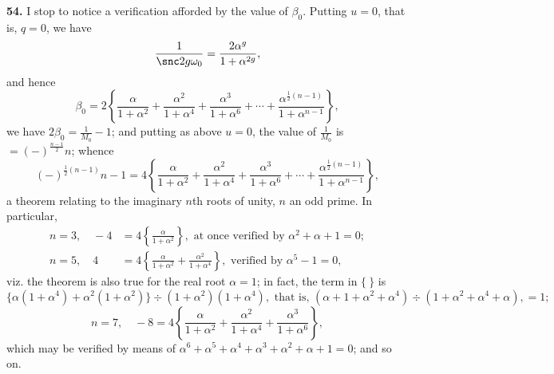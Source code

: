 \documentclass[11pt,a4paper]{book}
\begin{document}
\textbf{54.} I stop to notice a verification afforded by the value of $\beta_0$. Putting $u = 0$, that is, $q = 0$, we have
\[
\frac{1}{\snc 2g\omega_0} = \frac{2\alpha^g}{1 + \alpha^{2g}},
\]
and hence
\[
\beta_0 = 2\left\{
\frac{\alpha}{1 + \alpha^2} + \frac{\alpha^2}{1 + \alpha^4} + \frac{\alpha^3}{1 + \alpha^6} + \cdots
+ \frac{\alpha^{\frac{1}{2}(n-1)}}{1 + \alpha^{n-1}}\right\},
\]
we have $2\beta_0 = \frac{1}{M_0} - 1$; and putting as above $u = 0$, the value of $\frac{1}{M_0}$ is $= (-)^{\frac{n-1}{2}}n$; whence
\[
(-)^{\frac{1}{2}(n-1)}n - 1 = 4\left\{
\frac{\alpha}{1 + \alpha^2} + \frac{\alpha^2}{1 + \alpha^4} + \frac{\alpha^3}{1 + \alpha^6} + \cdots
+ \frac{\alpha^{\frac{1}{2}(n-1)}}{1 + \alpha^{n-1}}\right\},
\]
a theorem relating to the imaginary $n$th roots of unity, $n$ an odd prime. In particular,
\begin{align*}
n = 3, \quad -4 &= 4\left\{\frac{\alpha}{1 + \alpha^2}\right\}, \text{ at once verified by } \alpha^2 + \alpha + 1 = 0; \\
n = 5, \quad 4 &= 4\left\{\frac{\alpha}{1 + \alpha^2} + \frac{\alpha^2}{1 + \alpha^4}\right\}, \text{ verified by } \alpha^5 - 1 = 0,
\end{align*}
viz. the theorem is also true for the real root $\alpha = 1$; in fact, the term in $\{~\}$ is
\[
\{\alpha(1 + \alpha^4) + \alpha^2(1 + \alpha^2)\} \div (1 + \alpha^2)(1 + \alpha^4),
\text{ that is, } (\alpha + 1 + \alpha^2 + \alpha^4) \div (1 + \alpha^2 + \alpha^4 + \alpha), = 1;
\]
\[
n = 7, \quad -8 = 4\left\{\frac{\alpha}{1 + \alpha^2} + \frac{\alpha^2}{1 + \alpha^4} + \frac{\alpha^3}{1 + \alpha^6}\right\},
\]
which may be verified by means of $\alpha^6 + \alpha^5 + \alpha^4 + \alpha^3 + \alpha^2 + \alpha + 1 = 0$; and so on.
\end{document}
